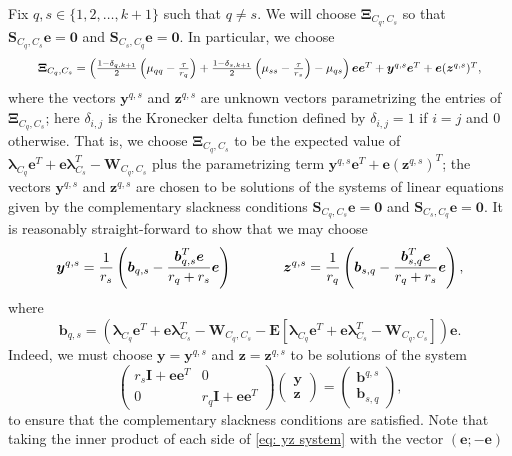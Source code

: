\documentclass[twoside,11pt]{article}
\renewcommand{\S}{\mathbf{S}}
\newcommand{\E}{\mathbf{E}}
\renewcommand{\b}{{\bs{b}}}
\newcommand{\e}{\bs {e}}
\newcommand{\bs}{\boldsymbol}
\newcommand{\y}{\bs {y}}
\newcommand{\W}{\bs {W}}
\newcommand{\z}{\bs{z}}
\newcommand{\0}{\bs{0}}
\newcommand{\vect}[1] {\ensuremath{\left(\begin{array}{c} #1 \end{array} \right)}} %
\newcommand{\mat}[1] {\ensuremath{ \left(\begin{array} #1 \end{array} \right)}} %
\newcommand{\sbra}[1] {\ensuremath{ \left[ #1\right]}} %
\newcommand{\rbra}[1]{\ensuremath{\left( #1 \right)}} %
\begin{document}
{%
Fix \(q, s \in \{1,2,\dots, k+1\}\) such that \(q\neq s\).
We will choose \(\bs \Xi_{C_q, C_s} \) so that \(\S_{C_q, C_s}\e = \bs 0\) and \( \S_{C_s, C_q} \e = \bs 0 \).
In particular, we choose
\begin{equation} \label{eq: Xi choice 1}
	\resizebox{0.92\hsize}{!}{$
\bs\Xi_{C_q, C_s} = \rbra{ \frac{1-\delta_{q, k+1}}{2}
\rbra{\mu_{qq} - \frac{\tau}{r_q}} +
\frac{1-\delta_{s, k+1}}{2}
\rbra{\mu_{ss} - \frac{\tau}{r_s}} - \mu_{qs}} \e\e^T
+ \y^{q,s} \e^T + \e (\z^{q,s})^T,
$}
\end{equation}
where the vectors \( \y^{q,s}\) and \(\z^{q,s}\) are unknown vectors parametrizing the entries of \(\bs\Xi_{C_q, C_s}\);
here
\(\delta_{i,j}\) is the Kronecker delta function defined by \( \delta_{i,j} = 1 \) if \(i=j\)
	and \(0\) otherwise.
That is, we choose \(\bs\Xi_{C_q, C_s} \) to be the expected value of
\( \bs \lambda_{C_q} \e^T + \e \bs \lambda_{C_s}^T
- \W_{C_q, C_s} \) plus the parametrizing term \(\y^{q,s} \e^T + \e (\z^{q,s})^T\); the vectors
\( \y^{q,s}\) and \(\z^{q,s}\) are chosen to be solutions of the systems of linear equations given
by the complementary slackness conditions
\(\S_{C_q, C_s}\e = \bs 0\) and \( \S_{C_s, C_q} \e = \bs 0 \).
It is reasonably straight-forward to show that we may choose
\begin{equation} \label{eq: y z}
\y^{q,s} = \frac{1}{r_s} \rbra{ \b_{q,s} - \frac{\b_{q,s}^T \e }{r_q + r_s} \e }
\hspace{0.5in}
\z^{q,s} = \frac{1}{r_q} \rbra{ \b_{s,q} - \frac{\b_{s,q}^T \e}{r_q + r_s} \e },
\end{equation}
where
\begin{equation} \label{eq: b}
\b_{q,s} = \rbra{ \bs \lambda_{C_q} \e^T + \e \bs \lambda_{C_s}^T
- \W_{C_q, C_s} - \E\sbra{\bs \lambda_{C_q} \e^T + \e \bs \lambda_{C_s}^T
- \W_{C_q, C_s}} } \e.
\end{equation}
Indeed, we must choose $\y = \y^{q,s}$ and $\z = \z^{q,s}$
to be solutions of the system
\newcommand{\I}{\bs I}
\begin{equation} \label{eq: yz system}
	\mat{{cc} r_s \I + \e\e^T & 0 \\ 0 & r_q \I + \e\e^T }
	\vect{ \y \\ \z } = \vect{\b^{q,s} \\ \b_{s,q} },
\end{equation}
to ensure that the complementary slackness conditions are satisfied.
Note that taking the inner product of each side
of \eqref{eq: yz system} with the vector \( (\e; -\e) \)
}
\end{document}
